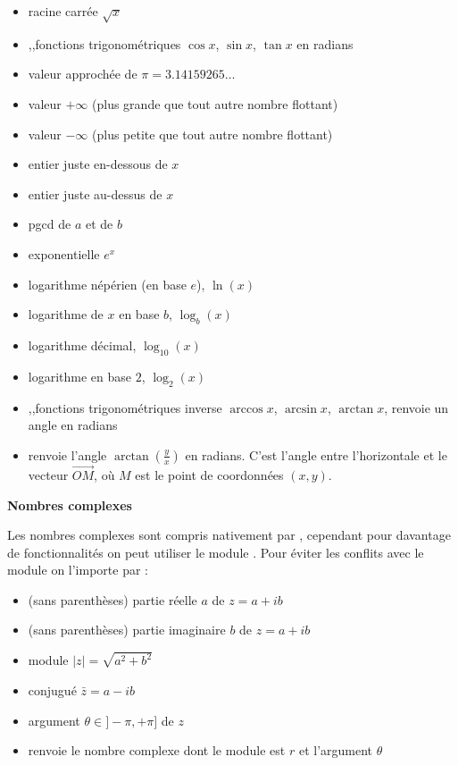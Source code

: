 \documentclass[11pt,class=report,crop=false]{standalone}
\begin{document}
\begin{itemize}
  \item {}\quad racine carrée $\sqrt{x}$
  \item {},\quad {},\quad {}\quad fonctions trigonométriques $\cos x$, $\sin x$, $\tan x$ en radians
  \item {}\quad valeur approchée de $\pi = 3.14159265\ldots$
  \item {} \quad valeur $+\infty$ (plus grande que tout autre nombre flottant)
  \item {} \quad valeur $-\infty$ (plus petite que tout autre nombre flottant)  
  \item {}\quad  entier juste en-dessous de $x$
  \item {}\quad  entier juste au-dessus de $x$
  \item {}\quad pgcd de $a$ et de $b$
  \item {} \quad exponentielle $e^x$
  \item {} \quad logarithme népérien (en base $e$), $\ln(x)$  
  \item {} \quad logarithme de $x$ en base $b$, $\log_b(x)$
  \item {} \quad logarithme décimal, $\log_{10}(x)$
  \item {} \quad logarithme en base $2$, $\log_{2}(x)$
  \item {},\quad {},\quad {}\quad fonctions trigonométriques inverse $\arccos x$, $\arcsin x$, $\arctan x$, renvoie un angle en radians
  \item {} \quad renvoie l'angle $\arctan(\frac yx)$ en radians. C'est l'angle entre l'horizontale et le vecteur $\overrightarrow{OM}$, où $M$ est le point de coordonnées $(x,y)$.
 \end{itemize}

\bigskip

\textbf{Nombres complexes}

Les nombres complexes sont compris nativement par \Python, cependant pour davantage de fonctionnalités on peut utiliser le module . Pour éviter les conflits avec le module  on l'importe par :

\begin{itemize}
	\item {} \quad (sans parenthèses) partie réelle $a$ de $z=a+ib$
	\item {} \quad (sans parenthèses) partie imaginaire $b$ de $z=a+ib$	 
	\item {} \quad module $|z| = \sqrt{a^2+b^2}$
	\item {} \quad conjugué $\bar z = a-ib$
	
	\item {} \quad argument $\theta \in ]-\pi,+\pi]$ de $z$
	
	\item {} renvoie le nombre complexe dont le module est $r$ et l'argument $\theta$
 \end{itemize}
\end{document}
